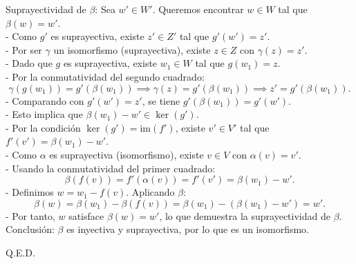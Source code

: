 \documentclass{article}
\begin{document}
Suprayectividad de \(\beta\):  
Sea \(w' \in W'\). Queremos encontrar \(w \in W\) tal que \(\beta(w) = w'\).  \\
- Como \(g'\) es suprayectiva, existe \(z' \in Z'\) tal que \(g'(w') = z'\).  \\
- Por ser \(\gamma\) un isomorfismo (suprayectiva), existe \(z \in Z\) con \(\gamma(z) = z'\).  \\
- Dado que \(g\) es suprayectiva, existe \(w_1 \in W\) tal que \(g(w_1) = z\).  \\
- Por la conmutatividad del segundo cuadrado:  
  \[
  \gamma(g(w_1)) = g'(\beta(w_1)) \implies \gamma(z) = g'(\beta(w_1)) \implies z' = g'(\beta(w_1)).
  \]  
- Comparando con \(g'(w') = z'\), se tiene \(g'(\beta(w_1)) = g'(w')\).  \\
- Esto implica que \(\beta(w_1) - w' \in \ker(g')\).  \\
- Por la condición \(\ker(g') = \text{im}(f')\), existe \(v' \in V'\) tal que \(f'(v') = \beta(w_1) - w'\).  \\
- Como \(\alpha\) es suprayectiva (isomorfismo), existe \(v \in V\) con \(\alpha(v) = v'\).  \\
- Usando la conmutatividad del primer cuadrado:  
  \[
  \beta(f(v)) = f'(\alpha(v)) = f'(v') = \beta(w_1) - w'.
  \]  
- Definimos \(w = w_1 - f(v)\). Aplicando \(\beta\):  
  \[
  \beta(w) = \beta(w_1) - \beta(f(v)) = \beta(w_1) - (\beta(w_1) - w') = w'.
  \]  
- Por tanto, \(w\) satisface \(\beta(w) = w'\), lo que demuestra la suprayectividad de \(\beta\).  \\

Conclusión:  
\(\beta\) es inyectiva y suprayectiva, por lo que es un isomorfismo.  

Q.E.D.
\end{document}
